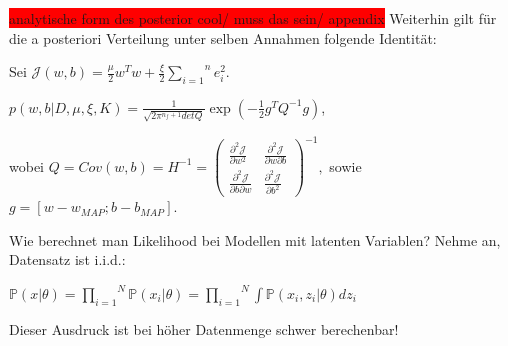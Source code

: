 \documentclass{beamer}
\begin{document}
{%





\begin{frame}
\colorbox{red}{analytische form des posterior cool/ muss das sein/ appendix}
Weiterhin gilt für die a posteriori Verteilung unter selben Annahmen folgende Identität:

Sei $\mathcal{J}(w,b) = \frac{\mu}{2}w^T w + \frac{\xi}{2}\overset{n}{\underset{i=1}{\sum}} e_i ^2$.
\begin{center}


$p(w,b \vert D, \mu, \xi, K) = \frac{1}{\sqrt{2\pi^{n_f +1} det Q}} \exp(-\frac{1}{2} g^T Q^{-1} g)$,

\end{center}

wobei $Q = Cov(w,b) =  H^{-1} 
= 
\begin{pmatrix}
\frac{\partial^2 \mathcal{J}}{\partial w^2 } & \frac{\partial^2 \mathcal{J}}{\partial w \partial b } \\
\frac{\partial^2 \mathcal{J}}{\partial b \partial w } & \frac{\partial^2 \mathcal{J}}{\partial b^2 }
\end{pmatrix}^{-1},
$
sowie $g = [w - w_{MAP}; b - b_{MAP}]$.


\end{frame}



\begin{frame}

 
 
Wie berechnet man Likelihood bei Modellen mit latenten Variablen? Nehme an, Datensatz ist i.i.d.:

\begin{center}
$\mathbb{P}(x\vert \theta) = \overset{N}{\underset{i=1}{\prod}}\mathbb{P}(x_i\vert \theta) = \overset{N}{\underset{i=1}{\prod}}\int\mathbb{P}(x_i, z_i\vert \theta)dz_i $
\end{center}

Dieser Ausdruck ist bei höher Datenmenge schwer berechenbar!

\end{frame}

}
\end{document}
